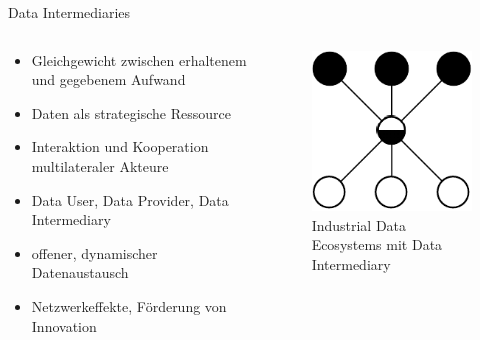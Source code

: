 \begin{frame}{Data Intermediaries \footnotesize\cite{mollerIndustrialDataEcosystems2024}}
    \begin{columns}
        \begin{column}{0.6\textwidth}
            \begin{itemize}
                \item Gleichgewicht zwischen erhaltenem und gegebenem Aufwand
                \item Daten als strategische Ressource %
                
                \item<2-> Interaktion und Kooperation \alert{multilateraler} Akteure
                \item<2-> Data User, Data Provider, Data Intermediary
                
                \item<3-> offener, dynamischer Datenaustausch
                \item<3-> Netzwerkeffekte, Förderung von Innovation
            \end{itemize}
        \end{column}
        
        \begin{column}{0.4\textwidth}
            \begin{figure}
                \centering
                \includegraphics[height=0.5\textheight]{./assets/industrial_de_architecture.drawio.pdf}
                \caption{Industrial Data Ecosystems mit Data Intermediary}
            \end{figure}
        \end{column}
    \end{columns}
\end{frame}


